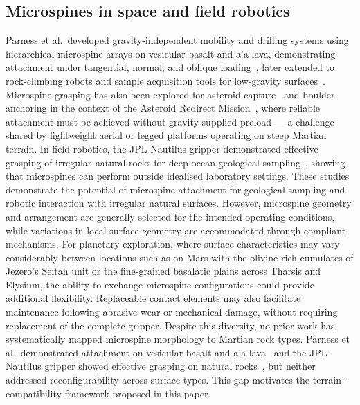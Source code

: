 \documentclass[letterpaper, 10 pt, conference, twoside]{ieeetran}
\begin{document}

\subsection{Microspines in space and field robotics}

Parness et al.\ developed gravity-independent mobility and drilling systems using hierarchical microspine arrays on vesicular basalt and a'a lava, demonstrating attachment under tangential, normal, and oblique loading~\cite{Parness2012Microspines}, later extended to rock-climbing robots and sample acquisition tools for low-gravity surfaces~\cite{Parness2013RockClimbing}. Microspine grasping has also been explored for asteroid capture~\cite{Merriam2016AsteroidCapture} and boulder anchoring in the context of the Asteroid Redirect Mission~\cite{Parness2017ARM}, where reliable attachment must be achieved without gravity-supplied preload --- a challenge shared by lightweight aerial or legged platforms operating on steep Martian terrain. In field robotics, the JPL-Nautilus gripper demonstrated effective grasping of irregular natural rocks for deep-ocean geological sampling~\cite{Backus2020Nautilus}, showing that microspines can perform outside idealised laboratory settings.
These studies demonstrate the potential of microspine attachment for geological sampling and robotic interaction with irregular natural surfaces. However, microspine geometry and arrangement are generally selected for the intended operating conditions, while variations in local surface geometry are accommodated through compliant mechanisms. For planetary exploration, where surface characteristics may vary considerably between locations such as on Mars with the olivine-rich cumulates of Jezero's Seitah unit or the fine-grained basalatic plains across Tharsis and Elysium, the ability to exchange microspine configurations could provide additional flexibility. Replaceable contact elements may also facilitate maintenance following abrasive wear or mechanical damage, without requiring replacement of the complete gripper. Despite this diversity, no prior work has systematically mapped microspine morphology to Martian rock types. Parness et al.\ demonstrated attachment on vesicular basalt and a'a lava~\cite{Parness2012Microspines} and the JPL-Nautilus gripper showed effective grasping on natural rocks~\cite{Backus2020Nautilus}, but neither addressed reconfigurability across surface types. This gap motivates the terrain-compatibility framework proposed in this paper.
\end{document}
